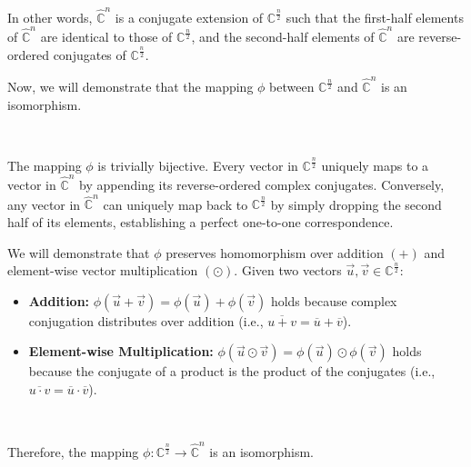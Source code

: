 In other words, $\hat{\mathbb{C}}^{n}$ is a conjugate extension of $\mathbb{C}^{\frac{n}{2}}$ such that the first-half elements of $\hat{\mathbb{C}}^{n}$ are identical to those of $\mathbb{C}^{\frac{n}{2}}$, and the second-half elements of $\hat{\mathbb{C}}^{n}$ are reverse-ordered conjugates of $\mathbb{C}^{\frac{n}{2}}$. 

Now, we will demonstrate that the mapping $\phi$ between $\mathbb{C}^{\frac{n}{2}}$ and $\hat{\mathbb{C}}^{n}$ is an isomorphism.


$ $

 The mapping $\phi$ is trivially bijective. Every vector in $\mathbb{C}^{\frac{n}{2}}$ uniquely maps to a vector in $\hat{\mathbb{C}}^{n}$ by appending its reverse-ordered complex conjugates. Conversely, any vector in $\hat{\mathbb{C}}^{n}$ can uniquely map back to $\mathbb{C}^{\frac{n}{2}}$ by simply dropping the second half of its elements, establishing a perfect one-to-one correspondence.

 We will demonstrate that $\phi$ preserves homomorphism over addition $(+)$ and element-wise vector multiplication $(\odot)$. Given two vectors $\vec{u}, \vec{v} \in \mathbb{C}^{\frac{n}{2}}$:
\begin{itemize}
    \item \textbf{Addition:} $\phi(\vec{u} + \vec{v}) = \phi(\vec{u}) + \phi(\vec{v})$ holds because complex conjugation distributes over addition (i.e., $\overline{u + v} = \overline{u} + \overline{v}$).
    \item \textbf{Element-wise Multiplication:} $\phi(\vec{u} \odot \vec{v}) = \phi(\vec{u}) \odot \phi(\vec{v})$ holds because the conjugate of a product is the product of the conjugates (i.e., $\overline{u \cdot v} = \overline{u} \cdot \overline{v}$).
\end{itemize}

$ $

Therefore, the mapping $\phi: \mathbb{C}^{\frac{n}{2}} \rightarrow \hat{\mathbb{C}}^{n}$ is an isomorphism.

